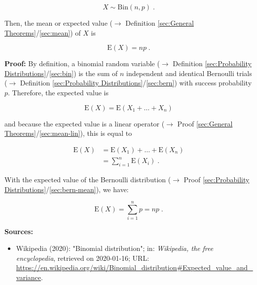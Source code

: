 \documentclass[a4paper,12pt,twoside]{book}
\begin{document}
\begin{equation} \label{eq:bin-mean-bin}
X \sim \mathrm{Bin}(n,p) \; .
\end{equation}

Then, the mean or expected value ($\rightarrow$ Definition \ref{sec:General Theorems}/\ref{sec:mean}) of $X$ is

\begin{equation} \label{eq:bin-mean-bin-mean}
\mathrm{E}(X) = n p \; .
\end{equation}


\vspace{1em}
\textbf{Proof:} By definition, a binomial random variable ($\rightarrow$ Definition \ref{sec:Probability Distributions}/\ref{sec:bin}) is the sum of $n$ independent and identical Bernoulli trials ($\rightarrow$ Definition \ref{sec:Probability Distributions}/\ref{sec:bern}) with success probability $p$. Therefore, the expected value is

\begin{equation} \label{eq:bin-mean-bin-mean-s1}
\mathrm{E}(X) = \mathrm{E}(X_1 + \ldots + X_n)
\end{equation}

and because the expected value is a linear operator ($\rightarrow$ Proof \ref{sec:General Theorems}/\ref{sec:mean-lin}), this is equal to

\begin{equation} \label{eq:bin-mean-bin-mean-s2}
\begin{split}
\mathrm{E}(X) &= \mathrm{E}(X_1) + \ldots + \mathrm{E}(X_n) \\
&= \sum_{i=1}^{n} \mathrm{E}(X_i) \; .
\end{split}
\end{equation}

With the expected value of the Bernoulli distribution ($\rightarrow$ Proof \ref{sec:Probability Distributions}/\ref{sec:bern-mean}), we have:

\begin{equation} \label{eq:bin-mean-bin-mean-s3}
\mathrm{E}(X) = \sum_{i=1}^{n} p = n p \; .
\end{equation}


\vspace{1em}
\textbf{Sources:}
\begin{itemize}
\item Wikipedia (2020): "Binomial distribution"; in: \textit{Wikipedia, the free encyclopedia}, retrieved on 2020-01-16; URL: \url{https://en.wikipedia.org/wiki/Binomial_distribution#Expected_value_and_variance}.
\end{itemize}
\end{document}
